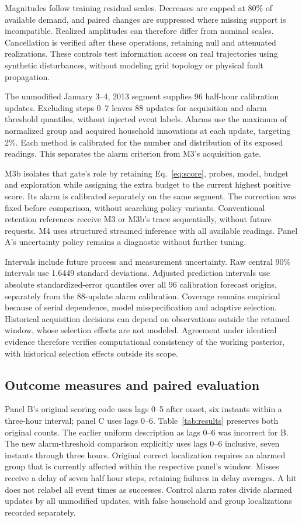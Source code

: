 \documentclass[conference]{IEEEtran}
\begin{document}
Magnitudes follow training residual scales. Decreases are capped at 80\% of available demand, and paired changes are suppressed where missing support is incompatible. Realized amplitudes can therefore differ from nominal scales. Cancellation is verified after these operations, retaining null and attenuated realizations. These controls test information access on real trajectories using synthetic disturbances, without modeling grid topology or physical fault propagation.

The unmodified January 3--4, 2013 segment supplies 96 half-hour calibration updates. Excluding steps 0--7 leaves 88 updates for acquisition and alarm threshold quantiles, without injected event labels. Alarms use the maximum of normalized group and acquired household innovations at each update, targeting 2\%. Each method is calibrated for the number and distribution of its exposed readings. This separates the alarm criterion from M3's acquisition gate.

M3b isolates that gate's role by retaining Eq.~\eqref{eq:score}, probes, model, budget and exploration while assigning the extra budget to the current highest positive score. Its alarm is calibrated separately on the same segment. The correction was fixed before comparison, without searching policy variants. Conventional retention references receive M3 or M3b's trace sequentially, without future requests. M4 uses structured streamed inference with all available readings. Panel A's uncertainty policy remains a diagnostic without further tuning.

Intervals include future process and measurement uncertainty. Raw central 90\% intervals use 1.6449 standard deviations. Adjusted prediction intervals use absolute standardized-error quantiles over all 96 calibration forecast origins, separately from the 88-update alarm calibration. Coverage remains empirical because of serial dependence, model misspecification and adaptive selection. Historical acquisition decisions can depend on observations outside the retained window, whose selection effects are not modeled. Agreement under identical evidence therefore verifies computational consistency of the working posterior, with historical selection effects outside its scope.

\subsection{Outcome measures and paired evaluation}
Panel B's original scoring code uses lags 0--5 after onset, six instants within a three-hour interval; panel C uses lags 0--6. Table~\ref{tab:results} preserves both original counts. The earlier uniform description as lags 0--6 was incorrect for B. The new alarm-threshold comparison explicitly uses lags 0--6 inclusive, seven instants through three hours. Original correct localization requires an alarmed group that is currently affected within the respective panel's window. Misses receive a delay of seven half hour steps, retaining failures in delay averages. A hit does not relabel all event times as successes. Control alarm rates divide alarmed updates by all unmodified updates, with false household and group localizations recorded separately.
\end{document}
